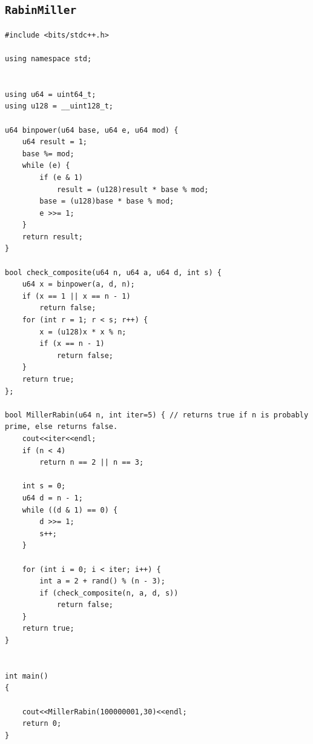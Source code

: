 \subsection{\texttt{RabinMiller}}
\begin{lstlisting}
#include <bits/stdc++.h>

using namespace std;


using u64 = uint64_t;
using u128 = __uint128_t;

u64 binpower(u64 base, u64 e, u64 mod) {
    u64 result = 1;
    base %= mod;
    while (e) {
        if (e & 1)
            result = (u128)result * base % mod;
        base = (u128)base * base % mod;
        e >>= 1;
    }
    return result;
}

bool check_composite(u64 n, u64 a, u64 d, int s) {
    u64 x = binpower(a, d, n);
    if (x == 1 || x == n - 1)
        return false;
    for (int r = 1; r < s; r++) {
        x = (u128)x * x % n;
        if (x == n - 1)
            return false;
    }
    return true;
};

bool MillerRabin(u64 n, int iter=5) { // returns true if n is probably prime, else returns false.
    cout<<iter<<endl;
    if (n < 4)
        return n == 2 || n == 3;

    int s = 0;
    u64 d = n - 1;
    while ((d & 1) == 0) {
        d >>= 1;
        s++;
    }

    for (int i = 0; i < iter; i++) {
        int a = 2 + rand() % (n - 3);
        if (check_composite(n, a, d, s))
            return false;
    }
    return true;
}


int main()
{

    cout<<MillerRabin(100000001,30)<<endl;
    return 0;
}\end{lstlisting}

